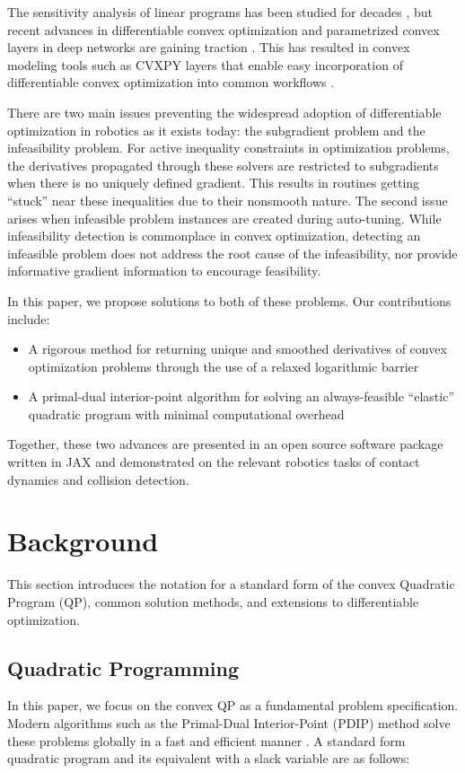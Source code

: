 The sensitivity analysis of linear programs has been studied for decades \cite{boyd2004}, but recent advances in differentiable convex optimization and parametrized convex layers in deep networks are gaining traction \cite{amos2019,agrawal2019a,agrawal2019}. This has resulted in convex modeling tools such as CVXPY layers that enable easy incorporation of differentiable convex optimization into common workflows \cite{diamond}.

There are two main issues preventing the widespread adoption of differentiable optimization in robotics as it exists today: the subgradient problem and the infeasibility problem. For active inequality constraints in optimization problems, the derivatives propagated through these solvers are restricted to subgradients when there is no uniquely defined gradient. This results in routines getting ``stuck'' near these inequalities due to their nonsmooth nature. The second issue arises when infeasible problem instances are created during auto-tuning. While infeasibility detection is commonplace in convex optimization, detecting an infeasible problem does not address the root cause of the infeasibility, nor provide informative gradient information to encourage feasibility.

In this paper, we propose solutions to both of these problems. Our contributions include:
\begin{itemize}
    \item A rigorous method for returning unique and smoothed derivatives of convex optimization problems through the use of a relaxed logarithmic barrier
    \item A primal-dual interior-point algorithm for solving an always-feasible ``elastic'' quadratic program with minimal computational overhead
\end{itemize}
Together, these two advances are presented in an open source software package written in JAX and demonstrated on the relevant robotics tasks of contact dynamics and collision detection.
%
%
\section{Background}
%
%
%
%
This section introduces the notation for a standard form of the convex Quadratic Program (QP), common solution methods, and extensions to differentiable optimization.
\subsection{Quadratic Programming}
In this paper, we focus on the convex QP as a fundamental problem specification. Modern algorithms such as the Primal-Dual Interior-Point (PDIP) method solve these problems globally in a fast and efficient manner \cite{mattingley2012}. A standard form quadratic program and its equivalent with a slack variable are as follows:

